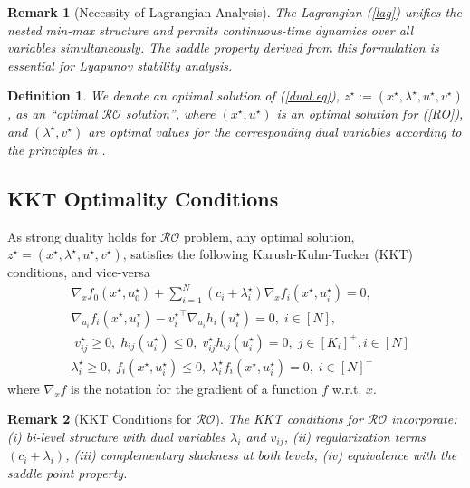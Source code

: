 \documentclass[journal,twoside,web]{ieeecolor}
\newtheorem{definition}{Definition}
\newtheorem{remark}{Remark}
\begin{document}
\begin{remark}[Necessity of Lagrangian Analysis]
The Lagrangian (\ref{lag}) unifies the nested min-max structure and permits continuous-time dynamics over all variables simultaneously. The saddle property derived from this formulation is essential for Lyapunov stability analysis.
\end{remark}

\begin{definition} \label{optimal_ro}
We denote an optimal solution of (\ref{dual.eq}), $z^\star:=(x^\star,\lambda^\star,u^\star,v^\star)$, as an ``optimal $\mathcal{RO}$ solution'', where $(x^\star, u^\star)$ is an optimal solution for (\ref{RO}), and $(\lambda^\star, v^\star)$ are optimal values for the corresponding dual variables according to the principles in \cite[Section~5.9.1]{boyd2004}.
\end{definition}

\subsection*{KKT Optimality Conditions}

As strong duality holds for $\mathcal{RO}$ problem, any optimal solution, $z^\star=(x^\star,\lambda^\star,u^\star,v^\star)$, satisfies the following Karush-Kuhn-Tucker (KKT) conditions, and vice-versa \cite{boyd2004}
\begin{align}
&\nabla_x f_0(x^\star,u_0^\star)+  \sum_{i=1}^N(c_i+\lambda^\star_i) \nabla_x f_i(x^\star,u_i^\star)=0,\label{kkt1}\\
&\nabla_{u_i} f_i(x^\star,u_i^\star)-{v_i^\star}^\top \nabla_{u_i} h_i(u_i^\star)=0,\; i\in[N],\label{kkt2}\\
&\;v_{ij}^\star\geq 0,\; h_{ij}(u_i^\star)\leq 0,\;v_{ij}^\star h_{ij}(u_i^\star)=0,\;  j\in[K_i]^+, i\in[N] \label{kkt3}\\
&\lambda_i^\star\geq 0,\;f_{i}(x^\star,u_i^\star)\leq 0,\;\lambda_i^\star f_{i}(x^\star,u_i^\star)=0,\;i\in[N]^+ \label{kkt4}
\end{align}
where $\nabla_x f$ is the notation for the gradient of a function $f$ w.r.t. $x$.

\begin{remark}[KKT Conditions for $\mathcal{RO}$]
The KKT conditions for $\mathcal{RO}$ incorporate: (i) bi-level structure with dual variables $\lambda_i$ and $v_{ij}$, (ii) regularization terms $(c_i + \lambda_i)$, (iii) complementary slackness at both levels, (iv) equivalence with the saddle point property.
\end{remark}
\end{document}
